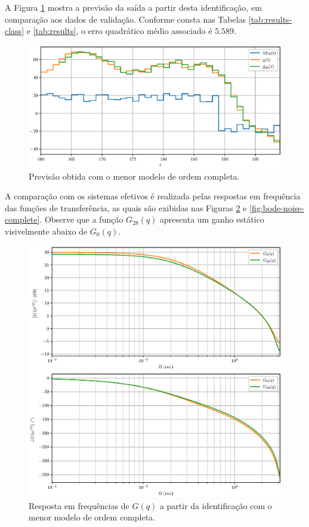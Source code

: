 \documentclass{ppgeesa}
\begin{document}
A Figura \ref{fig:prediction-complete} mostra a previsão da saída a partir desta identificação, em comparação aos dados de validação.
Conforme consta nas Tabelas \ref{tab:results-class} e \ref{tab:results}, o erro quadrático médio associado é $\num{5.589}$.
\begin{figure}[!htbp]
  \centering
  \includegraphics[width=\linewidth]{y_p_28}
  \caption{Previsão obtida com o menor modelo de ordem completa.}
  \label{fig:prediction-complete}
\end{figure}

A comparação com os sistemas efetivos é realizada pelas respostas em frequência das funções de transferência, as quais são exibidas nas Figuras \ref{fig:bode-system-complete} e \ref{fig:bode-noise-complete}.
Observe que a função $G_{28}(q)$ apresenta um ganho estático visivelmente abaixo de $G_0(q)$.
\begin{figure}[!htbp]
  \centering
  \includegraphics[width=\linewidth]{bode_G_28}
  \caption{Resposta em frequências de $G(q)$ a partir da identificação com o menor modelo de ordem completa.}
  \label{fig:bode-system-complete}
\end{figure}
\end{document}
